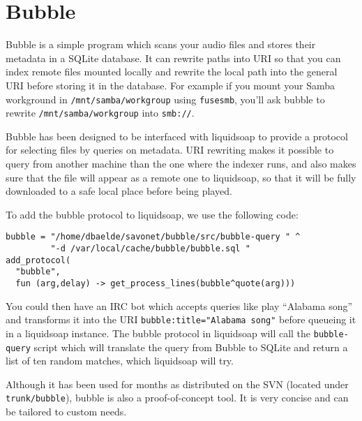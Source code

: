 \section{Bubble}
Bubble is a simple program which scans your audio files and stores their metadata in a SQLite database. It can rewrite paths into URI so that you can index remote files mounted locally and rewrite the local path into the general URI before storing it in the database. For example if you mount your Samba workground in \verb+/mnt/samba/workgroup+ using \verb+fusesmb+, you'll ask bubble to rewrite \verb+/mnt/samba/workgroup+ into \verb+smb://+.

Bubble has been designed to be interfaced with liquidsoap to provide a protocol for selecting files by queries on metadata. URI rewriting makes it possible to query from another machine than the one where the indexer runs, and also makes sure that the file will appear as a remote one to liquidsoap, so that it will be fully downloaded to a safe local place before being played.

To add the bubble protocol to liquidsoap, we use the following code:

\begin{verbatim}
bubble = "/home/dbaelde/savonet/bubble/src/bubble-query " ^
         "-d /var/local/cache/bubble/bubble.sql "
add_protocol(
  "bubble",
  fun (arg,delay) -> get_process_lines(bubble^quote(arg)))
\end{verbatim}
You could then have an IRC bot which accepts queries like play ``Alabama song'' and transforms it into the URI \verb+bubble:title="Alabama song"+ before queueing it in a liquidsoap instance. The bubble protocol in liquidsoap will call the \verb+bubble-query+ script which will translate the query from Bubble to SQLite and return a list of ten random matches, which liquidsoap will try.

Although it has been used for months as distributed on the SVN (located under \verb+trunk/bubble+), bubble is also a proof-of-concept tool. It is very concise and can be tailored to custom needs.

